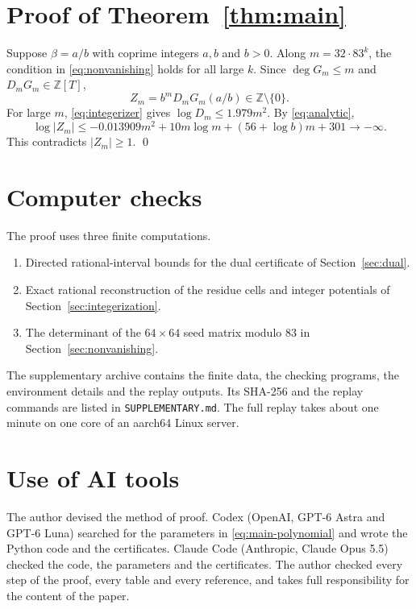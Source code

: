 \documentclass{amsart}
\numberwithin{equation}{section}
\numberwithin{table}{section}
\begin{document}
\section{Proof of Theorem~\ref{thm:main}}\label{sec:proof}

Suppose $\beta=a/b$ with coprime integers $a,b$ and $b>0$. Along
$m=32\cdot83^k$, the condition in \eqref{eq:nonvanishing} holds for all large
$k$. Since $\deg G_m\le m$ and $D_mG_m\in\mathbb Z[T]$,
\[
 Z_m=b^mD_mG_m(a/b)\in\mathbb Z\setminus\{0\}.
\]
For large $m$, \eqref{eq:integerizer} gives $\log D_m\le1.979m^2$. By
\eqref{eq:analytic},
\[
 \log|Z_m|\le -0.013909m^2+10m\log m+(56+\log b)m+301
 \longrightarrow -\infty.
\]
This contradicts $|Z_m|\ge1$.
\qed

\appendix

\section{Computer checks}\label{app:ver}

The proof uses three finite computations.
\begin{enumerate}
\item Directed rational-interval bounds for the dual certificate of
  Section~\ref{sec:dual}.
\item Exact rational reconstruction of the residue cells and integer
  potentials of Section~\ref{sec:integerization}.
\item The determinant of the $64\times64$ seed matrix modulo $83$ in
  Section~\ref{sec:nonvanishing}.
\end{enumerate}
The supplementary archive contains the finite data, the checking programs,
the environment details and the replay outputs. Its SHA-256 and the replay
commands are listed in \texttt{SUPPLEMENTARY.md}. The full replay takes about
one minute on one core of an aarch64 Linux server.

\section*{Use of AI tools}

The author devised the method of proof. Codex (OpenAI, GPT-6 Astra and GPT-6 Luna) searched for the parameters in \eqref{eq:main-polynomial}
and wrote the Python code and the certificates. Claude Code (Anthropic,
Claude Opus 5.5) checked the code, the parameters and the certificates. The author
checked every step of the proof, every table and every reference, and takes
full responsibility for the content of the paper.
\end{document}
